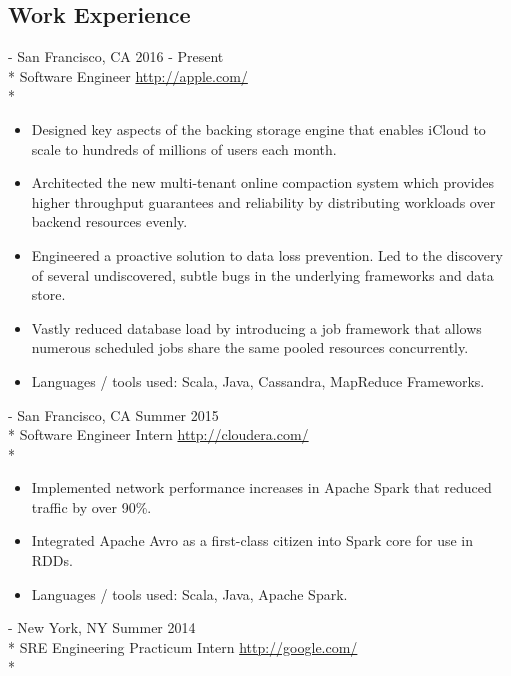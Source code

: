 \documentclass[a4paper,margin,line]{resume}
\newcommand{\rurl}[1]{\hfill {\footnotesize \url{#1}}}
\newcommand{\rdate}[1]{\hfill {\small #1}}
\renewcommand{\employer}[5]{ \item[#1] - #2 \rdate{#3} \\* #4 \rurl{#5} \\*}
\begin{document}
\begin{resume}
  \section{\mysidestyle Work Experience}
  \begin{asparadesc}
    \small
    \employer{Apple Inc. (iCloud)}{San Francisco, CA}{2016 - Present}{Software
      Engineer}{http://apple.com/}
    \vspace{-5mm}
    \begin{itemize}
      \item Designed key aspects of the backing storage engine that enables iCloud to scale to
        hundreds of millions of users each month.
      \item Architected the new multi-tenant online compaction system which provides higher
        throughput guarantees and reliability by distributing workloads over backend resources
        evenly.
      \item Engineered a proactive solution to data loss prevention. Led to the discovery of
        several undiscovered, subtle bugs in the underlying frameworks and data store.
      \item Vastly reduced database load by introducing a job framework that allows numerous
        scheduled jobs share the same pooled resources concurrently.
      \item Languages / tools used: Scala, Java, Cassandra, MapReduce Frameworks.
    \end{itemize}
    \employer{Cloudera}{San Francisco, CA}{Summer 2015}{Software Engineer
      Intern}{http://cloudera.com/}
    \vspace{-5mm}
    \begin{itemize}
    \item Implemented network performance increases in Apache Spark that reduced traffic by over
      90\%.
    \item Integrated Apache Avro as a first-class citizen into Spark core for use in RDDs.
    \item Languages / tools used: Scala, Java, Apache Spark.
    \end{itemize}
    \employer{Google}{New York, NY}{Summer 2014}{SRE Engineering Practicum
      Intern}{http://google.com/}
    \vspace{-5mm}
    \begin{itemize}

\end{itemize}
\end{asparadesc}
\end{resume}
\end{document}
